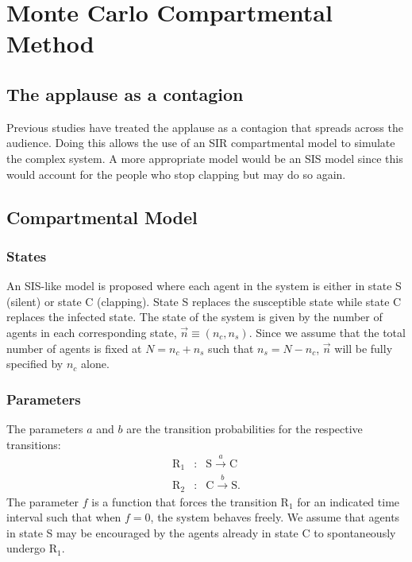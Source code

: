 \chapter{Monte Carlo Compartmental Method}
\label{chap2}
\def\a{(n \pi p)}
\def\aa{(\bar{n} \pi p)}
\def\b{kpL}
\def\c{k(1-p)L}
\def\s{\\sin{(\bar{n}\pi p)}}
\def\c{\\cos{(\bar{n}\pi p)}}
\def\statepsi{\mid \psi \; \rangle}
\def\energy{\mid E_{\vec{k}} \; \rangle}
\def\psixt{\mid \psi(x,t) \; \rangle}
\def\statepsixtrev{\mid \psi(x,t=T_{rev}) \; \rangle}
\def\statepsixt0{\mid \psi(x,t=0) \; \rangle}
\def\lowering{S^-_l \mid 0 \; \rangle}
\def\loweringa{S^-_m \; S^-_l \mid 0 \; \rangle}


\section{The applause as a contagion}
\hspace{\parindent} Previous studies have treated the applause as a contagion that spreads across the audience. Doing this allows the use of an SIR compartmental model to simulate the complex system.
A more appropriate model would be an SIS model since this would account for the people who stop clapping but may do so again. 

\section{Compartmental Model}
\subsection{States}
An SIS-like model is proposed where each agent in the system is either in state S (silent) or state C (clapping). State S replaces the susceptible state while state C replaces the infected state.
The state of the system is given by the number of agents in each corresponding state, $\vec{n}\equiv(n_{c},n_{s})$.
Since we assume that the total number of agents is fixed at $N = n_{c} + n_{s}$ such that $n_{s} = N-n_{c}$, $\vec{n}$ will be fully specified by $n_{c}$ alone.

\subsection{Parameters}
The parameters $a$ and $b$ are the transition probabilities for the respective transitions:
\begin{eqnarray}
\mathrm{R}_{1} &:& \mathrm{S} \overset{a}{\longrightarrow} \mathrm{C} \label{eq:r1} \\
\mathrm{R}_{2} &:& \mathrm{C} \overset{b}{\longrightarrow} \mathrm{S}.\label{eq:r2}
\end{eqnarray}
The parameter $f$ is a function that forces the transition $\mathrm{R}_{1}$ for an indicated time interval such that when $f=0$, the system behaves freely.
We assume that agents in state S may be encouraged by the agents already in state C to spontaneously undergo $\mathrm{R}_{1}$.

